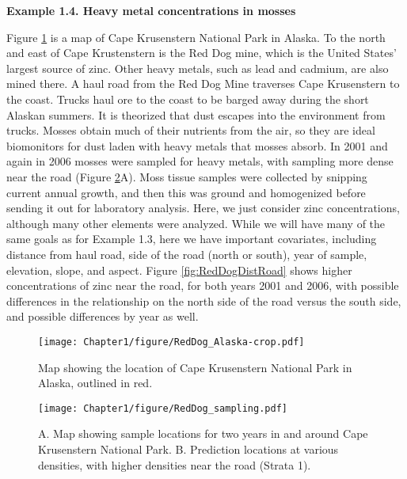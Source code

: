 \begin{tcolorbox}
{\bf Example 1.4.  Heavy metal concentrations in mosses}
\end{tcolorbox}

Figure \ref{fig:RedDogMap} is a map of Cape Krusenstern National Park in Alaska. To the north and east of Cape Krustenstern is the Red Dog mine, which is the United States' largest source of zinc. Other heavy metals, such as lead and cadmium, are also mined there. A haul road from the Red Dog Mine traverses Cape Krusenstern to the coast. Trucks haul ore to the coast to be barged away during the short Alaskan summers.  It is theorized that dust escapes into the environment from trucks. Mosses obtain much of their nutrients from the air, so they are ideal biomonitors for dust laden with heavy metals that mosses absorb.  In 2001 \citep{hasselbach2005spatial} and again in 2006 \citep{neitlich2017trends} mosses were sampled for heavy metals, with sampling more dense near the road (Figure \ref{fig:RedDogSampling}A).  Moss tissue samples were collected by snipping current annual growth, and then this was ground and homogenized before sending it out for laboratory analysis. Here, we just consider zinc concentrations, although many other elements were analyzed. While we will have many of the same goals as for Example 1.3, here we have important covariates, including distance from haul road, side of the road (north or south), year of sample, elevation, slope, and aspect.  Figure \ref{fig:RedDogDistRoad} shows higher concentrations of zinc near the road, for both years 2001 and 2006, with possible differences in the relationship on the north side of the road versus the south side, and possible differences by year as well.   

\begin{figure}
\begin{center}
\texttt{[image: Chapter1/figure/RedDog\_Alaska-crop.pdf]}
\caption{Map showing the location of Cape Krusenstern National Park in Alaska, outlined in red.\label{fig:RedDogMap}}
\end{center}
\end{figure}

\begin{figure}
\begin{center}
\texttt{[image: Chapter1/figure/RedDog\_sampling.pdf]}
\caption{A. Map showing sample locations for two years in and around Cape Krusenstern National Park. B. Prediction locations at various densities, with higher densities near the road (Strata 1). \label{fig:RedDogSampling}}
\end{center}
\end{figure}

